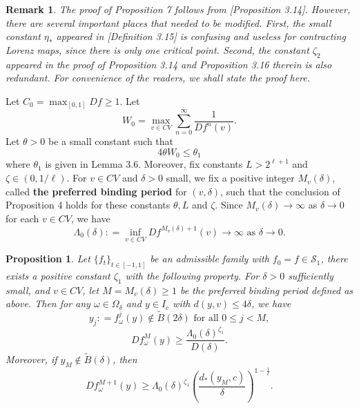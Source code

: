 \documentclass[11pt,oneside]{article}
\theoremstyle{plain}
\newtheorem{prop}{Proposition}
\newtheorem{remark}{Remark}
\numberwithin{equation}{section}
\numberwithin{figure}{section}
\numberwithin{table}{section}
\begin{document}
\begin{remark}

The proof of Proposition 7 follows from \cite{LR}[Proposition 3.14]. However, there are several important places that needed to be modified. First, the small constant $\eta_*$ appeared in \cite{LR}[Definition 3.15] is confusing and useless for contracting Lorenz maps, since there is only one critical point. Second, the constant $\zeta_2$ appeared in the proof of Proposition 3.14 and Proposition 3.16 therein is also redundant. For convenience of the readers, we shall state the proof here. 

\end{remark}



Let $C_0 = \max_{[0, 1]} Df \geq 1$. Let 
\[
W_0 = \max_{v \in CV} \sum_{n=0}^{\infty} \frac{1}{Df^n (v)}.
\]
Let $\theta > 0$ be a small constant such that 
\begin{equation}
4 \theta W_0 \leq \theta_1
\end{equation}
where $\theta_1$ is given in Lemma 3.6. Moreover, fix constants $L > 2^{\ell + 1}$ and $\zeta \in (0, 1/\ell)$. For $v \in CV$ and $\delta > 0$ small, we fix a positive integer $M_v(\delta)$, called {\bf the preferred binding period} for $(v, \delta)$, such that the conclusion of Proposition 4 holds for these constants $\theta, L$ and $\zeta$. Since $M_v(\delta) \to \infty$ as $\delta \to 0$ for each $v \in CV$, we have
\begin{equation}
\Lambda_0(\delta) : = \inf_{v \in CV} Df^{M_v(\delta) + 1}(v) \to \infty \text{ as } \delta \to 0. 
\end{equation}


\begin{prop}
Let $\{f_t \}_{t \in [-1, 1]} $ be an admissible family with $f_0 =f \in \mathcal S_1$, there exists a positive constant $\zeta_1$ with the following property. For $\delta > 0$ sufficiently small, and $v \in CV$, let $M = M_v(\delta) \geq 1$ be the preferred binding period defined as above. Then for any $\omega \in \Omega_{\delta}$ and $y \in I_c$ with $d(y, v)\leq 4 \delta$, we have 
\begin{equation}
y_j : = f_{\omega}^j(y) \notin \tilde B(2 \delta) \text{ for all } 0 \leq j < M, 
\end{equation}
\begin{equation}
Df_{\omega}^M (y) \geq \frac{\Lambda_0(\delta)^{\zeta_1}}{D(\delta)}. 
\end{equation}
Moreover, if $y_M \notin \tilde B(\delta)$, then
\begin{equation}
Df_{\omega}^{M+1}(y) \geq \Lambda_0(\delta)^{\zeta_1} \left( \frac{d_*(y_M, c)}{\delta} \right)^{1 - \frac{1}{\ell}}. 
\end{equation}
\end{prop}
\end{document}
